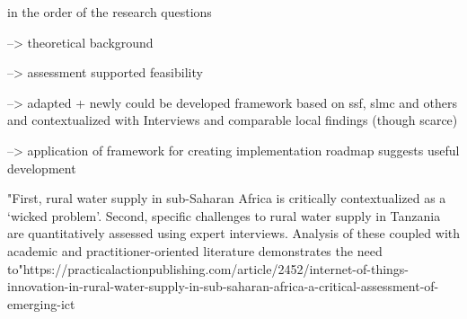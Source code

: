 
in the order of the research questions

--> theoretical background 

--> assessment supported feasibility%

--> adapted + newly could be developed framework based on ssf, slmc and others and contextualized with Interviews and comparable local findings (though scarce)

--> application of framework for creating implementation roadmap suggests useful development

"First, rural water supply in sub-Saharan Africa is critically contextualized as a ‘wicked problem’. Second, specific challenges to rural water supply in Tanzania are quantitatively assessed using expert interviews. Analysis of these coupled with academic and practitioner-oriented literature demonstrates the need to"https://practicalactionpublishing.com/article/2452/internet-of-things-innovation-in-rural-water-supply-in-sub-saharan-africa-a-critical-assessment-of-emerging-ict









